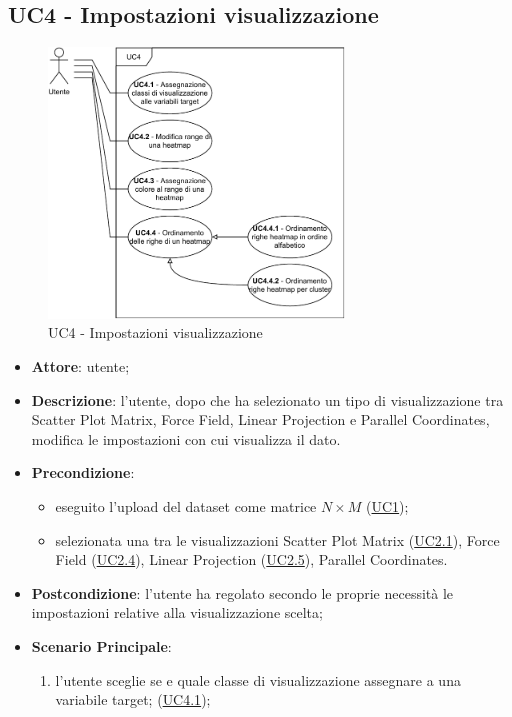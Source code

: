 \subsection{UC4 - Impostazioni visualizzazione}
\label{uc4}

    \begin{figure}[htbp]
        \centering
        \includegraphics[width=0.7\textwidth]{source/sections/casi-uso/diagrams/uc4.pdf}
        \caption{UC4 - Impostazioni visualizzazione}
        \label{fig:uc4}
    \end{figure}

\begin{itemize}
    \item \textbf{Attore}: utente;
    \item \textbf{Descrizione}: l'utente, dopo che ha selezionato un tipo di visualizzazione tra Scatter Plot Matrix, Force Field, Linear Projection e Parallel Coordinates, modifica le impostazioni con cui visualizza il dato.
    \item \textbf{Precondizione}: 
    \begin{itemize}
        \item eseguito l'upload del dataset come matrice $N\times M$ (\hyperref[uc1]{UC1});
        \item selezionata una tra le visualizzazioni Scatter Plot Matrix (\hyperref[uc2.1]{UC2.1}), Force Field (\hyperref[uc2.4]{UC2.4}), Linear Projection (\hyperref[uc2.5]{UC2.5}), Parallel Coordinates.
    \end{itemize}  
    \item \textbf{Postcondizione}: l'utente ha regolato secondo le proprie necessità le impostazioni relative alla visualizzazione scelta;
    \item \textbf{Scenario Principale}: 
    \begin{enumerate}
        \item l'utente sceglie se e quale classe di visualizzazione assegnare a una variabile target; (\hyperref[uc4.1]{UC4.1});
    \end{enumerate}  
    \end{itemize}


